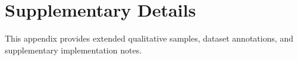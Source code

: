 \section{Supplementary Details}
\label{sec:appendix}

This appendix provides extended qualitative samples, dataset annotations, and supplementary implementation notes.
